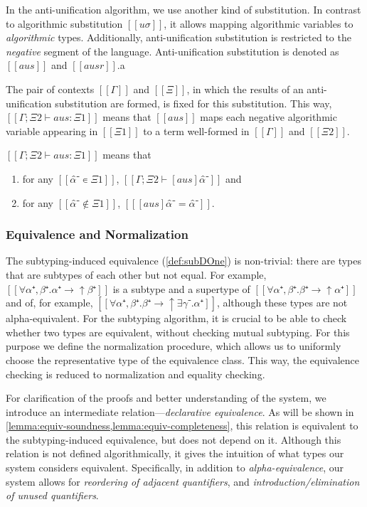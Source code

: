 In the anti-unification algorithm, we use another kind of substitution.
In contrast to algorithmic substitution $[[uσ]]$,
it allows mapping algorithmic variables to
\emph{algorithmic} types.
Additionally, anti-unification substitution is restricted to the
\emph{negative} segment of the language.
Anti-unification substitution is denoted as $[[aus]]$ and $[[ausr]]$.a

The pair of contexts $[[Γ]]$ and $[[Ξ]]$,
in which the results of an anti-unification substitution 
are formed, is fixed for this substitution.
This way, $[[Γ; Ξ2 ⊢ aus : Ξ1]]$ means that $[[aus]]$ maps each negative algorithmic
variable appearing in $[[Ξ1]]$ to a term well-formed in $[[Γ]]$ and $[[Ξ2]]$.

\begin{definition}
  $[[Γ; Ξ2 ⊢ aus : Ξ1]]$ means that
  \begin{enumerate}
    \item for any $[[ α̂⁻ ∊ Ξ1]]$, $[[ Γ; Ξ2 ⊢ [aus]α̂⁻ ]]$ and
    \item for any $[[ α̂⁻ ∉ Ξ1]]$, $[[ [aus]α̂⁻ = α̂⁻ ]]$.
  \end{enumerate}
\end{definition}

\subsubsection{Equivalence and Normalization}
\label{sec:equivalence-normalization}

The subtyping-induced equivalence (\cref{def:subDOne}) is non-trivial:
there are types that are subtypes of each other but not equal. 
For example, $[[∀α⁺,β⁺.α⁺ → ↑β⁺]]$ is a subtype and a supertype of $[[∀α⁺,β⁺.β⁺ → ↑α⁺]]$
and of, for example, $[[∀α⁺,β⁺.β⁺ → ↑∃γ⁻.α⁺]]$, 
although these types are not alpha-equivalent.
For the subtyping algorithm, it is crucial to be able to check whether
two types are equivalent, without checking mutual subtyping. 
For this purpose we define the normalization procedure, 
which allows us to uniformly choose the representative type of the equivalence class.
This way, the equivalence checking is reduced to normalization and equality checking. 

For clarification of the proofs and better understanding of the system, 
we introduce an intermediate relation---\emph{declarative equivalence}. 
As will be shown in \cref{lemma:equiv-soundness,lemma:equiv-completeness}, 
this relation is equivalent to the subtyping-induced equivalence, but does not 
depend on it. Although this relation is not defined algorithmically, 
it gives the intuition of what types our system considers equivalent.
Specifically, in addition to \emph{alpha-equivalence}, 
our system allows for \emph{reordering of adjacent quantifiers},
and \emph{introduction/elimination of unused quantifiers}.

